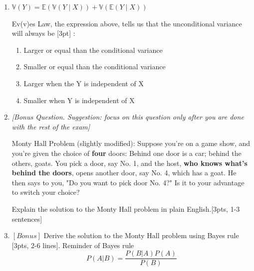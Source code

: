 \documentclass[12pt,notitlepage]{article}
\begin{document}
\begin{enumerate}
\item $\mathbb{V}(Y)=\mathbb{E}(\mathbb{V}(Y \mid X))+\mathbb{V}(\mathbb{E}(Y \mid X))$

Ev(v)es Law, the expression above, tells us that the unconditional variance will always be [3pt] : 
\begin{enumerate}
    \item Larger or equal than the conditional variance
    \item Smaller or equal than the conditional variance
    \item Larger when the Y is independent of X
    \item Smaller when Y is independent of X
\end{enumerate}
\vspace{3cm}
\newpage

\item \textit{[Bonus Question. Suggestion: focus on this question only after you are done with the rest of the exam]}

Monty Hall Problem (slightly modified):
Suppose you're on a game show, and you're given the choice of \textbf{four} doors: Behind one door is a car; behind the others, goats. You pick a door, say No. 1, and the host, \textbf{who knows what's behind the doors}, opens another door, say No. 4, which has a goat. He then says to you, "Do you want to pick door No. 4?" Is it to your advantage to switch your choice?

Explain the solution to the Monty Hall problem in plain English.[3pts, 1-3 sentences]
\vspace{3cm}

\item $[Bonus]$ Derive the solution to the Monty Hall problem using Bayes rule [3pts, 2-6 lines]. 
Reminder of Bayes rule 
\begin{equation}
    P(A|B) = \frac{P(B|A)P(A)}{P(B)}
\end{equation}
\vspace{3cm}



\newpage
\begin{center}
\end{center}
\newpage

\newpage
\begin{center}
\end{center}
\newpage
\end{enumerate}
\end{document}
